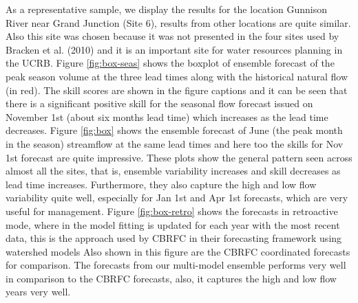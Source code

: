 \documentclass[final,5p,times,twocolumn,authoryear]{elsarticle}
\begin{document}
{\small

}

As a representative sample, we display the results for the location Gunnison River near Grand Junction (Site 6), results from other locations are quite similar. Also this site was chosen because it was not presented in the four sites used by Bracken et al. (2010) and it is an important site for water resources planning in the UCRB. Figure \ref{fig:box-seas} shows the boxplot of ensemble forecast of the peak season volume at the three lead times along with the historical natural flow (in red). The skill scores are shown in the figure captions and it can be seen that there is a significant positive skill for the seasonal flow forecast issued on November 1st (about six months lead time) which increases as the lead time decreases. Figure \ref{fig:box} shows the ensemble forecast of June (the peak month in the season) streamflow at the same lead times and here too the skills for Nov 1st forecast are quite impressive.  These plots show the general pattern seen across almost all the sites, that is, ensemble variability increases and skill decreases as lead time increases. Furthermore, they also capture the high and low flow variability quite well, especially for Jan 1st and Apr 1st forecasts, which are very useful for management. Figure \ref{fig:box-retro} shows the forecasts in retroactive mode, where in the model fitting is updated for each year with the most recent data, this is the approach used by CBRFC in their forecasting framework using watershed models  Also shown in this figure are the CBRFC coordinated forecasts for comparison. The forecasts from our multi-model ensemble performs very well in comparison to the CBRFC forecasts, also, it captures the high and low flow years very well.  

 
\begin{figure*}[htbp] %
   \centering
   
   \caption{Sample ensemble forecasts for (a) Apr1, (b) Feb1 and (c) Nov1 seasonal flow volumes at Gunnison River Near Grand Junction (Site 6). Boxplots extend to the 5th and 95th percentiles of each ensemble. MC stands for the median correlation, the correlation of the median of the ensembles withe the historical record.}
   \label{fig:box-seas}
\end{figure*}

\begin{figure*}[htbp] %
   \centering
   
   \caption{Same as Figure 3 but for June flows.}
   \label{fig:box}
\end{figure*}
\end{document}
